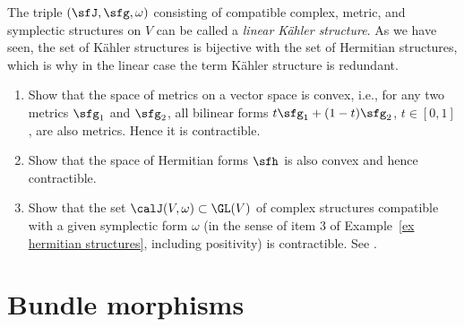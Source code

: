 \begin{example}
    The triple $(\sfJ,\sfg,\omega)$ consisting of compatible complex, metric, and symplectic structures on $V$ can be called a \emph{linear K\"ahler structure}. As we have seen, the set of K\"ahler structures is bijective with the set of Hermitian structures, which is why in the linear case the term K\"ahler structure is redundant.
\end{example}

\begin{xca}
    \begin{enumerate}
        \item Show that the space of metrics on a vector space is convex, i.e., for any two metrics $\sfg_1$ and $\sfg_2$, all bilinear forms $t\sfg_1+(1-t)\sfg_2$, $t\in[0,1]$, are also metrics. Hence it is contractible.
        \item Show that the space of Hermitian forms $\sfh$ is also convex and hence contractible.
        \item Show that the set $\calJ(V,\omega)\subset \GL(V)$ of complex structures compatible with a given symplectic form $\omega$ (in the sense of item 3 of Example~\ref{ex hermitian structures}, including positivity) is contractible. See \cite[Prop.~7.5.7]{RS1}.
    \end{enumerate}
\end{xca}







\section{Bundle morphisms}\label{sec: bundle morphisms}

